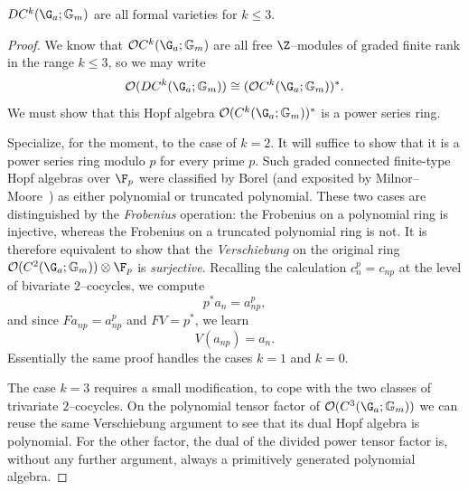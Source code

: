 \begin{lemma}\label{CkGaGmAreFVars}
\(DC^k(\G_a; \Gm)\) are all formal varieties for \(k \le 3\).
\end{lemma}
\begin{proof}
We know that \(\sheaf O C^k(\G_a; \Gm)\) are all free \(\Z\)--modules of graded finite rank in the range \(k \le 3\), so we may write \[\sheaf O(D C^k(\G_a; \Gm)) \cong (\sheaf O C^k(\G_a; \Gm))^*.\]
We must show that this Hopf algebra \(\sheaf O(C^k(\G_a; \Gm))^*\) is a power series ring.

Specialize, for the moment, to the case of \(k = 2\).
It will suffice to show that it is a power series ring modulo \(p\) for every prime \(p\).
Such graded connected finite-type Hopf algebras over \(\F_p\) were classified by Borel (and exposited by Milnor--Moore~\cite[Theorem 7.11]{MilnorMoore}) as either polynomial or truncated polynomial.
These two cases are distinguished by the \textit{Frobenius} operation: the Frobenius on a polynomial ring is injective, whereas the Frobenius on a truncated polynomial ring is not.
It is therefore equivalent to show that the \emph{Verschiebung} on the original ring \(\sheaf O(C^2(\G_a; \Gm)) \otimes \F_p\) is \emph{surjective}.
Recalling the calculation \(c_n^p = c_{np}\) at the level of bivariate \(2\)--cocycles, we compute \[p^* a_n = a_{np}^p,\] and since \(F a_{np} = a_{np}^p\) and \(FV = p^*\), we learn \[V(a_{np}) = a_n.\]
Essentially the same proof handles the cases \(k = 1\) and \(k = 0\).

The case \(k = 3\) requires a small modification, to cope with the two classes of trivariate \(2\)--cocycles.
On the polynomial tensor factor of \(\sheaf O(C^3(\G_a; \Gm))\) we can reuse the same Verschiebung argument to see that its dual Hopf algebra is polynomial.
For the other factor, the dual of the divided power tensor factor is, without any further argument, always a primitively generated polynomial algebra.
\end{proof}

